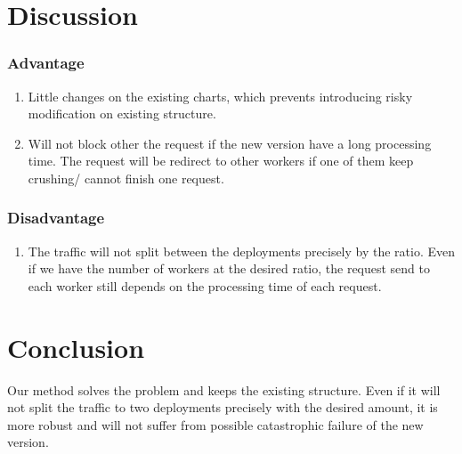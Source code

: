 \documentclass{article}
\begin{document}
\section{Discussion}
\subsubsection{Advantage}
\begin{enumerate}
    \item Little changes on the existing charts, which prevents introducing risky modification on existing structure.
    \item Will not block other the request if the new version have a long processing time. The request will be redirect to other workers if one of them keep crushing/ cannot finish one request. 
\end{enumerate}

\subsubsection{Disadvantage}
\begin{enumerate}
    \item The traffic will not split between the deployments precisely by the ratio. Even if we have the number of workers at the desired ratio, the request send to each worker still depends on the processing time of each request. 
\end{enumerate}

\section{Conclusion}
Our method solves the problem and keeps the existing structure. Even if it will not split the traffic to two deployments precisely with the desired amount, it is more robust and will not suffer from possible catastrophic failure of the new version.
\end{document}
